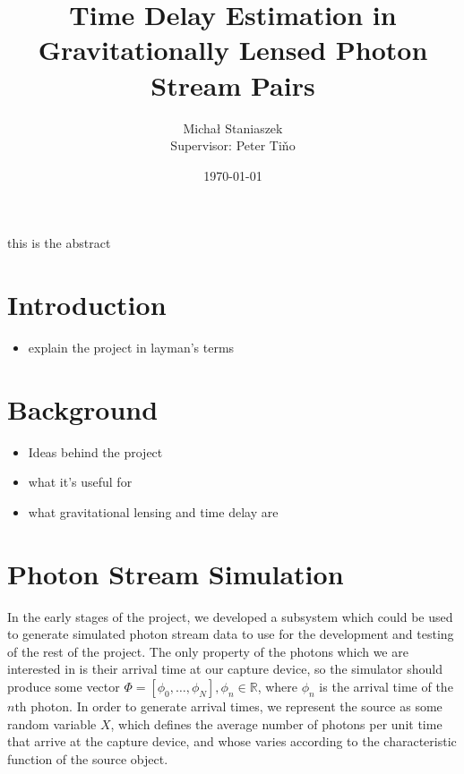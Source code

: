 \documentclass[a4paper,11pt]{article}
\title{Time Delay Estimation in Gravitationally Lensed Photon Stream Pairs}
\author{\Large{Micha{\l} Staniaszek} \\\small{Supervisor: Peter Ti{\v{n}}o}}
\date{\today}
\begin{document}
\maketitle


this is the abstract

\section{Introduction}
\label{sec-1}

\begin{itemize}
\item explain the project in layman's terms
\end{itemize}
\section{Background}
\label{sec-2}

\begin{itemize}
\item Ideas behind the project
\item what it's useful for
\item what gravitational lensing and time delay are
\end{itemize}
\section{Photon Stream Simulation}
\label{sec-3}

In the early stages of the project, we developed a subsystem which could be used
to generate simulated photon stream data to use for the development and testing
of the rest of the project. The only property of the photons which we are
interested in is their arrival time at our capture device, so the simulator
should produce some vector $\Phi=\left[\phi_0,\dots,\phi_N\right], \phi_n \in
\mathbb{R}$, where $\phi_n$ is the arrival time of the $n\text{th}$ photon. In
order to generate arrival times, we represent the source as some random variable
$X$, which defines the average number of photons per unit time that arrive at
the capture device, and whose varies according to the characteristic function of
the source object.
\end{document}
